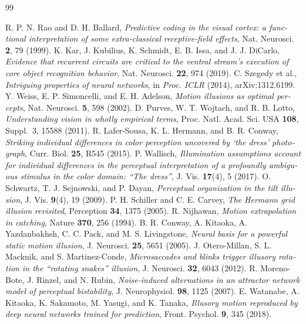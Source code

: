 \begin{thebibliography}{99}
\begin{otherlanguage}{english}
 R. P. N. Rao and D. H. Ballard, \emph{Predictive coding in the visual cortex: a functional interpretation of some extra-classical receptive-field effects}, Nat. Neurosci. \textbf{2}, 79 (1999).
 K. Kar, J. Kubilius, K. Schmidt, E. B. Issa, and J. J. DiCarlo, \emph{Evidence that recurrent circuits are critical to the ventral stream's execution of core object recognition behavior}, Nat. Neurosci. \textbf{22}, 974 (2019).
 C. Szegedy et al., \emph{Intriguing properties of neural networks}, in \emph{Proc. ICLR} (2014), arXiv:1312.6199.
 Y. Weiss, E. P. Simoncelli, and E. H. Adelson, \emph{Motion illusions as optimal percepts}, Nat. Neurosci. \textbf{5}, 598 (2002).
 D. Purves, W. T. Wojtach, and R. B. Lotto, \emph{Understanding vision in wholly empirical terms}, Proc. Natl. Acad. Sci. USA \textbf{108}, Suppl.~3, 15588 (2011).
 R. Lafer-Sousa, K. L. Hermann, and B. R. Conway, \emph{Striking individual differences in color perception uncovered by `the dress' photograph}, Curr. Biol. \textbf{25}, R545 (2015).
 P. Wallisch, \emph{Illumination assumptions account for individual differences in the perceptual interpretation of a profoundly ambiguous stimulus in the color domain: ``The dress''}, J. Vis. \textbf{17}(4), 5 (2017).
 O. Schwartz, T. J. Sejnowski, and P. Dayan, \emph{Perceptual organization in the tilt illusion}, J. Vis. \textbf{9}(4), 19 (2009).
 P. H. Schiller and C. E. Carvey, \emph{The Hermann grid illusion revisited}, Perception \textbf{34}, 1375 (2005).
 R. Nijhawan, \emph{Motion extrapolation in catching}, Nature \textbf{370}, 256 (1994).
 B. R. Conway, A. Kitaoka, A. Yazdanbakhsh, C. C. Pack, and M. S. Livingstone, \emph{Neural basis for a powerful static motion illusion}, J. Neurosci. \textbf{25}, 5651 (2005).
 J. Otero-Millan, S. L. Macknik, and S. Martinez-Conde, \emph{Microsaccades and blinks trigger illusory rotation in the ``rotating snakes'' illusion}, J. Neurosci. \textbf{32}, 6043 (2012).
 R. Moreno-Bote, J. Rinzel, and N. Rubin, \emph{Noise-induced alternations in an attractor network model of perceptual bistability}, J. Neurophysiol. \textbf{98}, 1125 (2007).
 E. Watanabe, A. Kitaoka, K. Sakamoto, M. Yasugi, and K. Tanaka, \emph{Illusory motion reproduced by deep neural networks trained for prediction}, Front. Psychol. \textbf{9}, 345 (2018).

\end{otherlanguage}
\end{thebibliography}
